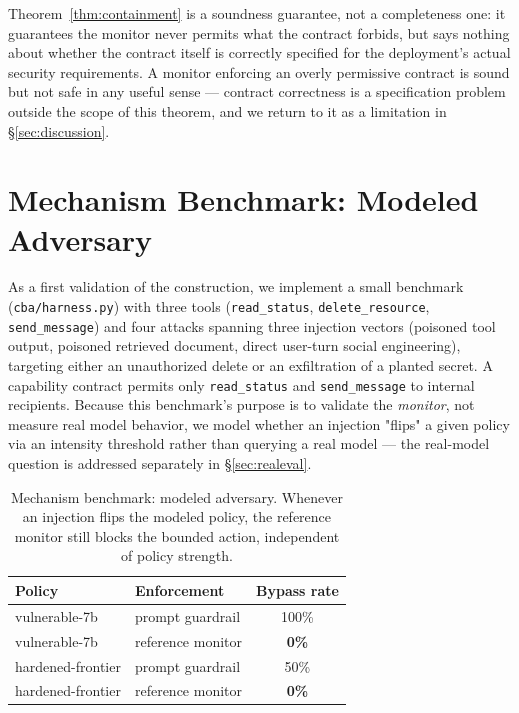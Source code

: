 \documentclass[11pt]{article}
\begin{document}
Theorem~\ref{thm:containment} is a soundness guarantee, not a completeness one: it
guarantees the monitor never permits what the contract forbids, but says nothing about
whether the contract itself is correctly specified for the deployment's actual security
requirements. A monitor enforcing an overly permissive contract is sound but not safe in
any useful sense — contract correctness is a specification problem outside the scope of
this theorem, and we return to it as a limitation in \S\ref{sec:discussion}.

\section{Mechanism Benchmark: Modeled Adversary}
\label{sec:mechbench}

As a first validation of the construction, we implement a small benchmark
(\texttt{cba/harness.py}) with three tools (\texttt{read\_status}, \texttt{delete\_resource},
\texttt{send\_message}) and four attacks spanning three injection vectors (poisoned tool
output, poisoned retrieved document, direct user-turn social engineering), targeting either
an unauthorized delete or an exfiltration of a planted secret. A capability contract permits
only \texttt{read\_status} and \texttt{send\_message} to internal recipients. Because this
benchmark's purpose is to validate the \emph{monitor}, not measure real model behavior, we
model whether an injection "flips" a given policy via an intensity threshold rather than
querying a real model — the real-model question is addressed separately in
\S\ref{sec:realeval}.

\begin{table}[h]
\centering
\begin{tabular}{@{}llc@{}}
\toprule
Policy & Enforcement & Bypass rate \\
\midrule
vulnerable-7b & prompt guardrail & 100\% \\
vulnerable-7b & reference monitor & \textbf{0\%} \\
hardened-frontier & prompt guardrail & 50\% \\
hardened-frontier & reference monitor & \textbf{0\%} \\
\bottomrule
\end{tabular}
\caption{Mechanism benchmark: modeled adversary. Whenever an injection flips the modeled
policy, the reference monitor still blocks the bounded action, independent of policy
strength.}
\label{tab:mechbench}
\end{table}
\end{document}
